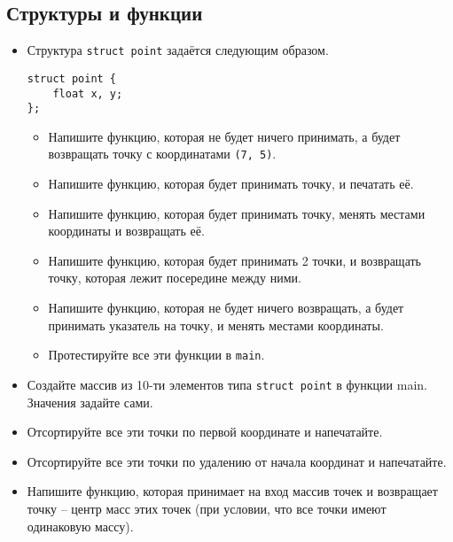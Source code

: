 \documentclass{article}
\begin{document}
\subsection*{Структуры и функции}
\begin{itemize}
\item Структура \texttt{struct point} задаётся следующим образом.
\begin{lstlisting}
struct point {
    float x, y;
};
\end{lstlisting}
\begin{itemize}
\item Напишите функцию, которая не будет ничего принимать, а будет возвращать точку с координатами \texttt{(7, 5)}.
\item Напишите функцию, которая будет принимать точку, и печатать её.
\item Напишите функцию, которая будет принимать точку, менять местами координаты и возвращать её.
\item Напишите функцию, которая будет принимать 2 точки, и возвращать точку, которая лежит посередине между ними.
\item Напишите функцию, которая не будет ничего возвращать, а будет принимать указатель на точку, и менять местами координаты.
\item Протестируйте все эти функции в \texttt{main}.
\end{itemize}
\item Создайте массив из 10-ти элементов типа \texttt{struct point} в функции main. Значения задайте сами.
\item Отсортируйте все эти точки по первой координате и напечатайте.
\item Отсортируйте все эти точки по удалению от начала координат и напечатайте.
\item Напишите функцию, которая принимает на вход массив точек и возвращает точку -- центр масс этих точек (при условии, что все точки имеют одинаковую массу).
\end{itemize}
\end{document}
